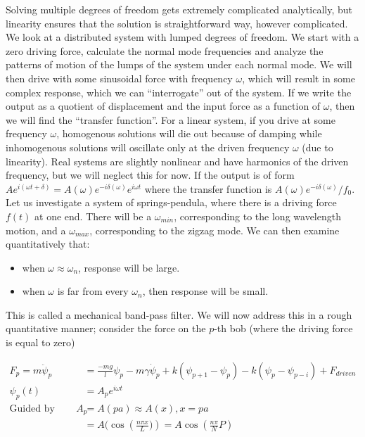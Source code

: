 \documentclass{report}
\begin{document}
Solving multiple degrees of freedom gets extremely complicated analytically, but linearity ensures that the solution is straightforward way, however complicated. We look at a distributed system with lumped degrees of freedom. We start with a zero driving force, calculate the normal mode frequencies and analyze the patterns of motion of the lumps of the system under each normal mode. We will then drive with some sinusoidal force with frequency $\omega$, which will result in some complex response, which we can ``interrogate'' out of the system. If we write the output as a quotient of displacement and the input force as a function of $\omega$, then we will find the ``transfer function''. For a linear system, if you drive at some frequency $\omega$, homogenous solutions will die out because of damping while inhomogenous solutions will oscillate only at the driven frequency $\omega$ (due to linearity). Real systems are slightly nonlinear and have harmonics of the driven frequency, but we will neglect this for now. If the output is of form $Ae^{i(\omega t + \delta)} = A(\omega)e^{-i\delta(\omega)}e^{i\omega t}$ where the transfer function is $A(\omega)e^{-i\delta(\omega)}/f_0$. Let us investigate a system of springs-pendula, where there is a driving force $f(t)$ at one end. There will be a $\omega_{min}$, corresponding to the long wavelength motion, and a $\omega_{max}$, corresponding to the zigzag mode. We can then examine quantitatively that:

\begin{itemize}
\item when $\omega \approx \omega_n$, response will be large.
\item when $\omega$ is far from every $\omega_n$, then response will be small.
\end{itemize}

This is called a mechanical band-pass filter. We will now address this in a rough quantitative manner; consider the force on the $p$-th bob (where the driving force is equal to zero)

\begin{align*}
F_p = m\ddot{\psi}_p &= \frac{-mg}{l}\psi_p - m \gamma \dot{\psi}_p + k(\psi_{p+1} - \psi_p) - k(\psi_p - \psi_{p-i}) + F_{driven}\\
\psi_p(t) &= A_pe^{i\omega t}\\
\mbox{Guided by continum limit, we guess at: } A_p &= A(pa) \approx A(x), x = pa\\
&= A(\cos\left(\frac{n\pi x}{L})\right) = A\cos\left(\frac{n\pi}{N}P\right)\\
\end{align*}
\end{document}
